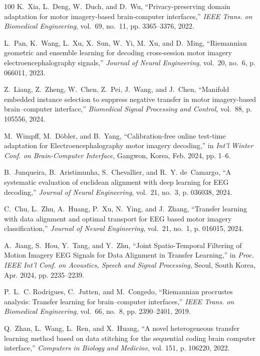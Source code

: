 \documentclass[journal]{IEEEtran}
\begin{document}
\begin{thebibliography}{100}
K.~Xia, L.~Deng, W.~Duch, and D.~Wu, ``Privacy-preserving domain adaptation for
  motor imagery-based brain-computer interfaces,'' \emph{IEEE Trans. on
  Biomedical Engineering}, vol.~69, no.~11, pp. 3365--3376, 2022.

L.~Pan, K.~Wang, L.~Xu, X.~Sun, W.~Yi, M.~Xu, and D.~Ming, ``Riemannian
  geometric and ensemble learning for decoding cross-session motor imagery
  electroencephalography signals,'' \emph{Journal of Neural Engineering},
  vol.~20, no.~6, p. 066011, 2023.

Z.~Liang, Z.~Zheng, W.~Chen, Z.~Pei, J.~Wang, and J.~Chen, ``Manifold embedded
  instance selection to suppress negative transfer in motor imagery-based
  brain--computer interface,'' \emph{Biomedical Signal Processing and Control},
  vol.~88, p. 105556, 2024.

M.~Wimpff, M.~Döbler, and B.~Yang, ``Calibration-free online test-time
  adaptation for {E}lectroencephalography motor imagery decoding,'' in
  \emph{Int'l Winter Conf. on Brain-Computer Interface}, Gangwon, Korea, Feb.
  2024, pp. 1--6.

B.~Junqueira, B.~Aristimunha, S.~Chevallier, and R.~Y. de~Camargo, ``A
  systematic evaluation of euclidean alignment with deep learning for {EEG}
  decoding,'' \emph{Journal of Neural Engineering}, vol.~21, no.~3, p. 036038,
  2024.

C.~Chu, L.~Zhu, A.~Huang, P.~Xu, N.~Ying, and J.~Zhang, ``Transfer learning
  with data alignment and optimal transport for {EEG} based motor imagery
  classification,'' \emph{Journal of Neural Engineering}, vol.~21, no.~1, p.
  016015, 2024.

A.~Jiang, S.~Hou, Y.~Tang, and Y.~Zhu, ``{Joint Spatio-Temporal Filtering of
  Motion Imagery {EEG} Signals for Data Alignment in Transfer Learning},'' in
  \emph{Proc. IEEE Int'l Conf. on Acoustics, Speech and Signal Processing},
  Seoul, South Korea, Apr. 2024, pp. 2235--2239.

P.~L.~C. Rodrigues, C.~Jutten, and M.~Congedo, ``Riemannian procrustes
  analysis: Transfer learning for brain–computer interfaces,'' \emph{IEEE
  Trans. on Biomedical Engineering}, vol.~66, no.~8, pp. 2390--2401, 2019.

Q.~Zhan, L.~Wang, L.~Ren, and X.~Huang, ``A novel heterogeneous transfer
  learning method based on data stitching for the sequential coding brain
  computer interface,'' \emph{Computers in Biology and Medicine}, vol. 151, p.
  106220, 2022.


\end{thebibliography}
\end{document}
